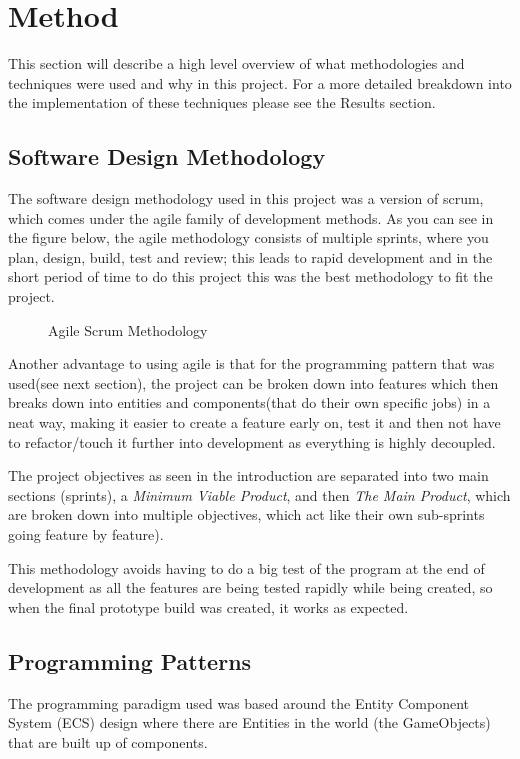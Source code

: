 \documentclass[11pt]{report}
\begin{document}
\chapter{Method}
This section will describe a high level overview of what methodologies and techniques were used and why in this project. For a more detailed breakdown into the implementation of these techniques please see the Results section.
\section{Software Design Methodology}
The software design methodology used in this project was a version of scrum, which comes under the agile family of development methods. As you can see in the figure below\cite{AgileMethodology}, the agile methodology consists of multiple sprints, where you plan, design, build, test and review; this leads to rapid development and in the short period of time to do this project this was the best methodology to fit the project. 
\begin{figure}[H]
    \centering
    \caption{Agile Scrum Methodology}
\end{figure}
Another advantage to using agile is that for the programming pattern that was used(see next section), the project can be broken down into features which then breaks down into entities and components(that do their own specific jobs) in a neat way, making it easier to create a feature early on, test it and then not have to refactor/touch it further into development as everything is highly decoupled. 

The project objectives as seen in the introduction are separated into two main sections (sprints), a \textit{Minimum Viable Product}, and then \textit{The Main Product}, which are broken down into multiple objectives, which act like their own sub-sprints going feature by feature).  

This methodology avoids having to do a big test of the program at the end of development as all the features are being tested rapidly while being created, so when the final prototype build was created, it works as expected.

\section{Programming Patterns}
The programming paradigm used was based around the Entity Component System (ECS) design where there are Entities in the world (the GameObjects) that are built up of components.
\end{document}
